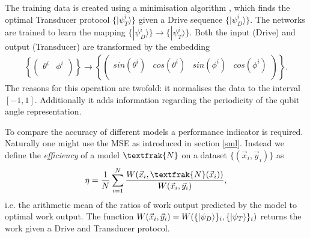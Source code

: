 The training data is created using a minimisation algorithm \cite{2020SciPy-NMeth}, which finds the optimal Transducer protocol $\{|\psi_T^i \rangle\}$ given a Drive sequence $\{|\psi_D^i \rangle\}$.
The networks are trained to learn the mapping $\{|\psi_D^i \rangle\} \to \{|\psi_T^i \rangle\}$.
Both the input (Drive) and output (Transducer) are transformed by the embedding
\begin{align*}
	\left\{
	\begin{pmatrix}
	\theta^i & \phi^i \\
	\end{pmatrix}
	\right\}
	\to
	\left\{
	\begin{pmatrix}
	sin(\theta^i) & cos(\theta^i) & sin(\phi^i) & cos(\phi^i) \\
	\end{pmatrix}
	\right\}.
\end{align*}
The reasons for this operation are twofold: it normalises the data to the interval $[-1, 1]$. Additionally it adds information regarding the periodicity of the qubit angle representation.


To compare the accuracy of different models a performance indicator is required. 
Naturally one might use the MSE as introduced in section \ref{sml}.
Instead we define the \textit{efficiency} of a model $\textfrak{N}$ on a dataset $\{(\vec{x}_i, \vec{y}_i)\}$ as
\begin{align}
	\eta = \frac{1}{N} \sum_{i=1}^N \frac{W(\vec{x}_i,\textfrak{N}(\vec{x}_i))}{W(\vec{x}_i,\vec{y}_i)},
\end{align}
i.e. the arithmetic mean of the ratios of work output predicted by the model to optimal work output.
The function $W(\vec{x}_i, \vec{y}_i) = W(\{\ket{\psi_D}\}_i, \{\ket{\psi_T}\}_i)$ returns the work given a Drive and Transducer protocol.